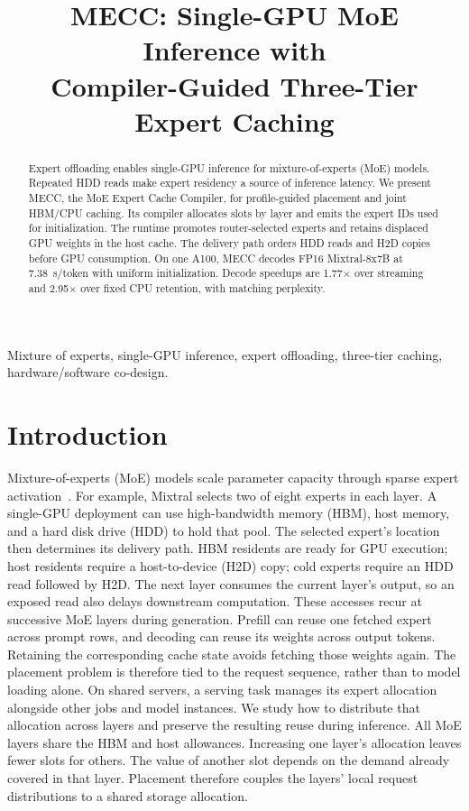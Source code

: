 \documentclass[conference,9pt,letterpaper]{IEEEtran}
\title{MECC: Single-GPU MoE Inference with\protect\\Compiler-Guided Three-Tier Expert Caching}
\author{}
\begin{document}
\maketitle\raggedbottom
\balance
\begin{abstract}
Expert offloading enables single-GPU inference for mixture-of-experts (MoE) models. Repeated HDD reads make expert residency a source of inference latency. We present MECC, the MoE Expert Cache Compiler, for profile-guided placement and joint HBM/CPU caching. Its compiler allocates slots by layer and emits the expert IDs used for initialization. The runtime promotes router-selected experts and retains displaced GPU weights in the host cache. The delivery path orders HDD reads and H2D copies before GPU consumption. On one A100, MECC decodes FP16 Mixtral-8x7B at 7.38~s/token with uniform initialization. Decode speedups are 1.77$\times$ over streaming and 2.95$\times$ over fixed CPU retention, with matching perplexity.
\end{abstract}

\begin{IEEEkeywords}
Mixture of experts, single-GPU inference, expert offloading, three-tier caching, hardware/software co-design.
\end{IEEEkeywords}

\section{Introduction}
Mixture-of-experts (MoE) models scale parameter capacity through sparse expert activation~\cite{shazeer,switch,mixtral,deepseekmoe}. For example, Mixtral selects two of eight experts in each layer. A single-GPU deployment can use high-bandwidth memory (HBM), host memory, and a hard disk drive (HDD) to hold that pool. The selected expert's location then determines its delivery path. HBM residents are ready for GPU execution; host residents require a host-to-device (H2D) copy; cold experts require an HDD read followed by H2D. The next layer consumes the current layer's output, so an exposed read also delays downstream computation. These accesses recur at successive MoE layers during generation. Prefill can reuse one fetched expert across prompt rows, and decoding can reuse its weights across output tokens. Retaining the corresponding cache state avoids fetching those weights again. The placement problem is therefore tied to the request sequence, rather than to model loading alone. On shared servers, a serving task manages its expert allocation alongside other jobs and model instances. We study how to distribute that allocation across layers and preserve the resulting reuse during inference. All MoE layers share the HBM and host allowances. Increasing one layer's allocation leaves fewer slots for others. The value of another slot depends on the demand already covered in that layer. Placement therefore couples the layers' local request distributions to a shared storage allocation.
\end{document}
